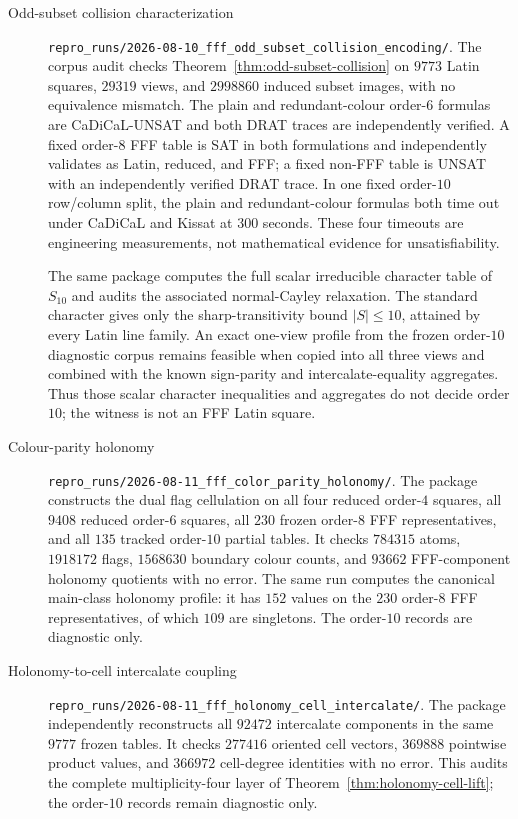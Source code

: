 \begin{description}
\item[Odd-subset collision characterization]
\nolinkurl{repro_runs/2026-08-10_fff_odd_subset_collision_encoding/}.
The corpus audit checks Theorem~\ref{thm:odd-subset-collision} on $9773$
Latin squares, $29319$ views, and $2998860$ induced subset images, with no
equivalence mismatch.  The plain and redundant-colour order-$6$ formulas are
CaDiCaL-UNSAT and both DRAT traces are independently verified.  A fixed
order-$8$ FFF table is SAT in both formulations and independently validates
as Latin, reduced, and FFF; a fixed non-FFF table is UNSAT with an
independently verified DRAT trace.  In one fixed order-$10$ row/column split,
the plain and redundant-colour formulas both time out under CaDiCaL and
Kissat at $300$ seconds.  These four timeouts are engineering measurements,
not mathematical evidence for unsatisfiability.

The same package computes the full scalar irreducible character table of
$S_{10}$ and audits the associated normal-Cayley relaxation.  The standard
character gives only the sharp-transitivity bound $|S|\leq10$, attained by
every Latin line family.  An exact one-view profile from the frozen
order-$10$ diagnostic corpus remains feasible when copied into all three
views and combined with the known sign-parity and intercalate-equality
aggregates.  Thus those scalar character inequalities and aggregates do not
decide order $10$; the witness is not an FFF Latin square.

\item[Colour-parity holonomy]
\nolinkurl{repro_runs/2026-08-11_fff_color_parity_holonomy/}.
The package constructs the dual flag cellulation on all four reduced
order-$4$ squares, all $9408$ reduced order-$6$ squares, all $230$ frozen
order-$8$ FFF representatives, and all $135$ tracked order-$10$ partial
tables.  It checks $784315$ atoms, $1918172$ flags, $1568630$ boundary
colour counts, and $93662$ FFF-component holonomy quotients with no error.
The same run computes the canonical main-class holonomy profile: it has
$152$ values on the $230$ order-$8$ FFF representatives, of which $109$ are
singletons.  The order-$10$ records are diagnostic only.

\item[Holonomy-to-cell intercalate coupling]
\nolinkurl{repro_runs/2026-08-11_fff_holonomy_cell_intercalate/}.
The package independently reconstructs all $92472$ intercalate components
in the same $9777$ frozen tables.  It checks $277416$ oriented cell vectors,
$369888$ pointwise product values, and $366972$ cell-degree identities with
no error.  This audits the complete multiplicity-four layer of
Theorem~\ref{thm:holonomy-cell-lift}; the order-$10$ records remain
diagnostic only.


\end{description}

